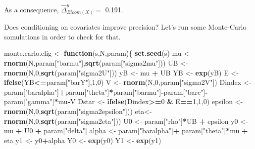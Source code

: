 \documentclass[]{book}
\newenvironment{Shaded}{\begin{snugshade}}{\end{snugshade}}
\newcommand{\ControlFlowTok}[1]{\textcolor[rgb]{0.13,0.29,0.53}{\textbf{#1}}}
\newcommand{\DecValTok}[1]{\textcolor[rgb]{0.00,0.00,0.81}{#1}}
\newcommand{\KeywordTok}[1]{\textcolor[rgb]{0.13,0.29,0.53}{\textbf{#1}}}
\newcommand{\NormalTok}[1]{#1}
\newcommand{\OperatorTok}[1]{\textcolor[rgb]{0.81,0.36,0.00}{\textbf{#1}}}
\newcommand{\StringTok}[1]{\textcolor[rgb]{0.31,0.60,0.02}{#1}}
\theoremstyle{definition}
\theoremstyle{definition}
\theoremstyle{definition}
\theoremstyle{remark}
\begin{document}
As a consequence, \(\hat{\Delta}^y_{Bloom(X)}=\) 0.191.

Does conditioning on covariates improve precision?
Let's run some Monte-Carlo somulations in order to check for that.

\begin{Shaded}
\begin{Highlighting}[]
\NormalTok{monte.carlo.elig <-}\StringTok{ }\ControlFlowTok{function}\NormalTok{(s,N,param)\{}
  \KeywordTok{set.seed}\NormalTok{(s)}
\NormalTok{  mu <-}\StringTok{ }\KeywordTok{rnorm}\NormalTok{(N,param[}\StringTok{"barmu"}\NormalTok{],}\KeywordTok{sqrt}\NormalTok{(param[}\StringTok{"sigma2mu"}\NormalTok{]))}
\NormalTok{  UB <-}\StringTok{ }\KeywordTok{rnorm}\NormalTok{(N,}\DecValTok{0}\NormalTok{,}\KeywordTok{sqrt}\NormalTok{(param[}\StringTok{"sigma2U"}\NormalTok{]))}
\NormalTok{  yB <-}\StringTok{ }\NormalTok{mu }\OperatorTok{+}\StringTok{ }\NormalTok{UB }
\NormalTok{  YB <-}\StringTok{ }\KeywordTok{exp}\NormalTok{(yB)}
\NormalTok{  E <-}\StringTok{ }\KeywordTok{ifelse}\NormalTok{(YB}\OperatorTok{<=}\NormalTok{param[}\StringTok{"barY"}\NormalTok{],}\DecValTok{1}\NormalTok{,}\DecValTok{0}\NormalTok{)}
\NormalTok{  V <-}\StringTok{ }\KeywordTok{rnorm}\NormalTok{(N,}\DecValTok{0}\NormalTok{,param[}\StringTok{"sigma2V"}\NormalTok{])}
\NormalTok{  Dindex <-}\StringTok{ }\NormalTok{param[}\StringTok{"baralpha"}\NormalTok{]}\OperatorTok{+}\NormalTok{param[}\StringTok{"theta"}\NormalTok{]}\OperatorTok{*}\NormalTok{param[}\StringTok{"barmu"}\NormalTok{]}\OperatorTok{-}\NormalTok{param[}\StringTok{"barc"}\NormalTok{]}\OperatorTok{-}\NormalTok{param[}\StringTok{"gamma"}\NormalTok{]}\OperatorTok{*}\NormalTok{mu}\OperatorTok{-}\NormalTok{V}
\NormalTok{  Dstar <-}\StringTok{ }\KeywordTok{ifelse}\NormalTok{(Dindex}\OperatorTok{>=}\DecValTok{0} \OperatorTok{&}\StringTok{ }\NormalTok{E}\OperatorTok{==}\DecValTok{1}\NormalTok{,}\DecValTok{1}\NormalTok{,}\DecValTok{0}\NormalTok{)}
\NormalTok{  epsilon <-}\StringTok{ }\KeywordTok{rnorm}\NormalTok{(N,}\DecValTok{0}\NormalTok{,}\KeywordTok{sqrt}\NormalTok{(param[}\StringTok{"sigma2epsilon"}\NormalTok{]))}
\NormalTok{  eta<-}\StringTok{ }\KeywordTok{rnorm}\NormalTok{(N,}\DecValTok{0}\NormalTok{,}\KeywordTok{sqrt}\NormalTok{(param[}\StringTok{"sigma2eta"}\NormalTok{]))}
\NormalTok{  U0 <-}\StringTok{ }\NormalTok{param[}\StringTok{"rho"}\NormalTok{]}\OperatorTok{*}\NormalTok{UB }\OperatorTok{+}\StringTok{ }\NormalTok{epsilon}
\NormalTok{  y0 <-}\StringTok{ }\NormalTok{mu }\OperatorTok{+}\StringTok{  }\NormalTok{U0 }\OperatorTok{+}\StringTok{ }\NormalTok{param[}\StringTok{"delta"}\NormalTok{]}
\NormalTok{  alpha <-}\StringTok{ }\NormalTok{param[}\StringTok{"baralpha"}\NormalTok{]}\OperatorTok{+}\StringTok{  }\NormalTok{param[}\StringTok{"theta"}\NormalTok{]}\OperatorTok{*}\NormalTok{mu }\OperatorTok{+}\StringTok{ }\NormalTok{eta}
\NormalTok{  y1 <-}\StringTok{ }\NormalTok{y0}\OperatorTok{+}\NormalTok{alpha}
\NormalTok{  Y0 <-}\StringTok{ }\KeywordTok{exp}\NormalTok{(y0)}
\NormalTok{  Y1 <-}\StringTok{ }\KeywordTok{exp}\NormalTok{(y1)}
  

\end{Highlighting}
\end{Shaded}
\end{document}
